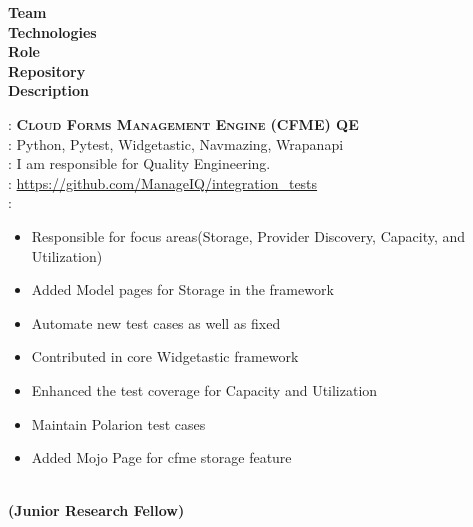 \documentclass[a4paper,10pt]{memoir} %
\begin{document}
\begin{minipage}[t]{0.20\columnwidth}
\textbf{Team}\\
\textbf{Technologies}\\
\textbf{Role}\\
\textbf{Repository}\\
\textbf{Description}
\end{minipage}
\hfill
\begin{minipage}[t]{0.80\columnwidth}
: \textbf{\textsc{Cloud Forms Management Engine (CFME) QE}}\\
: Python, Pytest, Widgetastic, Navmazing, Wrapanapi\\
: I am responsible for Quality Engineering.\\
: \url{https://github.com/ManageIQ/integration_tests}\\
: \begin{itemize}
\item Responsible for focus areas(Storage, Provider Discovery, Capacity, and Utilization) 
\item Added Model pages for Storage in the framework
\item Automate new test cases as well as fixed 
\item Contributed in core Widgetastic framework 
\item Enhanced the test coverage for Capacity and Utilization
\item Maintain Polarion test cases
\item Added Mojo Page for cfme storage feature 
  \end{itemize}

\end{minipage}

\Sep
\Sep
\begin{minipage}[t]{0.20\columnwidth}
\end{minipage}
\hfill
\begin{minipage}[t]{0.80\columnwidth}
\begin{center}
\\
\textbf{(Junior Research Fellow)}  
\end{center}
\end{minipage}
\end{document}
